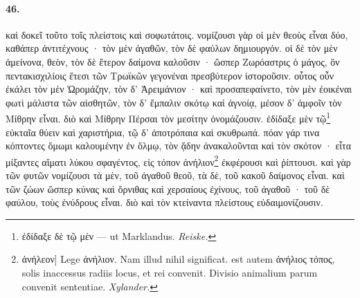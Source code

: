 \documentclass[a4paper, 11pt, oneside, polutonikogreek, german, landscape]{article}
\begin{document}
\paragraph{46.}
καὶ δοκεῖ τοῦτο τοῖς πλείστοις καὶ σοφωτάτοις. νομίζουσι γὰρ οἱ μὲν θεοὺς εἶναι δύο, καθάπερ ἀντιτέχνους · τὸν μὲν ἀγαθῶν, τὸν δὲ φαύλων δημιουργόν. οἱ δὲ τὸν μὲν ἀμείνονα, θεὸν, τὸν δὲ ἕτερον δαίμονα καλοῦσιν · ὥσπερ Ζωρόαστρις ὁ μάγος, ὃν πεντακισχιλίοις ἔτεσι τῶν Τρωϊκῶν γεγονέναι πρεσβύτερον ἱστοροῦσιν. οὗτος οὖν ἐκάλει τὸν μὲν Ὡρομάζην, τὸν δ' Ἀρειμάνιον · καὶ προσαπεφαίνετο, τὸν μὲν ἐοικέναι φωτὶ μάλιστα τῶν αἰσθητῶν, τὸν δ' ἔμπαλιν σκότῳ καὶ ἀγνοίᾳ, μέσον δ' ἀμφοῖν τὸν Μίθρην εἶναι. διὸ καὶ Μίθρην Πέρσαι τὸν μεσίτην ὀνομάζουσιν. ἐδίδαξε μὲν τῷ\footnote{ἐδίδαξε δὲ τῷ μὲν --- ut Marklandus. \emph{Reiske.}} εὐκταῖα θύειν καὶ χαριστήρια, τῷ δ' ἀποτρόπαια καὶ σκυθρωπά. πόαν γάρ τινα κόπτοντες ὅμωμι καλουμένην ἐν ὅλμῳ, τὸν ᾅδην ἀνακαλοῦνται καὶ τὸν σκότον · εἶτα μίξαντες αἵματι λύκου σφαγέντος, εἰς τόπον ἀνήλιον\footnote{ἀνήλεον] Lege ἀνήλιον. Nam illud nihil significat. est autem ἀνήλιος τόπος, solis inaccessus radiis locus, et rei convenit. Divisio animalium parum convenit sententiae. \emph{Xylander.}} ἐκφέρουσι καὶ ῥίπτουσι. καὶ γὰρ τῶν φυτῶν νομίζουσι τὰ μὲν, τοῦ ἀγαθοῦ θεοῦ, τὰ δὲ, τοῦ κακοῦ δαίμονος εἶναι. καὶ τῶν ζώων ὥσπερ κύνας καὶ ὄρνιθας καὶ χερσαίους ἐχίνους, τοῦ ἀγαθοῦ · τοῦ δὲ φαύλου, τοὺς ἐνύδρους εἶναι. διὸ καὶ τὸν κτείναντα πλείστους εὐδαιμονίζουσιν.
\end{document}
